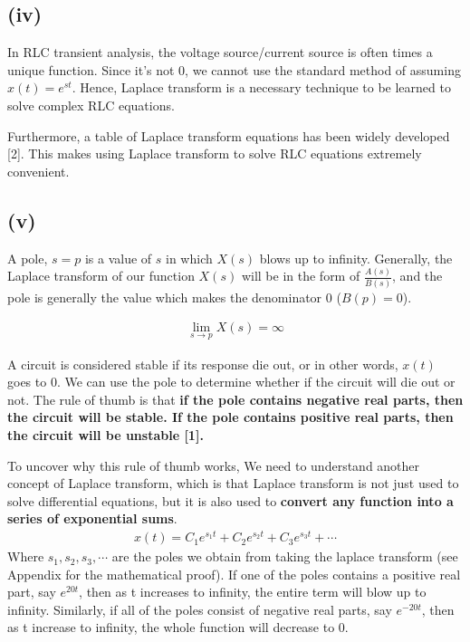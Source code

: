 \subsection{(iv)}
In RLC transient analysis, the voltage source/current source is often times a unique function. Since it's not 0, we cannot use the standard method of assuming $x(t)=e^{st}$. Hence, Laplace transform is a necessary technique to be learned to solve complex RLC equations.

Furthermore, a table of Laplace transform equations has been widely developed [2]. This makes using Laplace transform to solve RLC equations extremely convenient.

\subsection{(v)}
A pole, $s=p$ is a value of $s$ in which $X(s)$ blows up to infinity. Generally, the Laplace transform of our function $X(s)$ will be in the form of $\frac{A(s)}{B(s)}$, and the pole is generally the value which makes the denominator 0 ($B(p)=0$).

\begin{align*}
    \boxed{\lim_{s \rightarrow p}X(s) = \infty}
\end{align*}

A circuit is considered stable if its response die out, or in other words, $x(t)$ goes to 0. We can use the pole to determine whether if the circuit will die out or not. The rule of thumb is that \textbf{if the pole contains negative real parts, then the circuit will be stable. If the pole contains positive real parts, then the circuit will be unstable [1].}

To uncover why this rule of thumb works, We need to understand another concept of Laplace transform, which is that Laplace transform is not just used to solve differential equations, but it is also used to \textbf{convert any function into a series of exponential sums}.
\begin{align*}
    \boxed{x(t) = C_1e^{s_1t} + C_2e^{s_2t} + C_3e^{s_3t} + \cdots}
\end{align*}
Where $s_1, s_2, s_3, \cdots$ are the poles we obtain from taking the laplace transform (see Appendix for the mathematical proof). If one of the poles contains a positive real part, say $e^{20t}$, then as t increases to infinity, the entire term will blow up to infinity. Similarly, if all of the poles consist of negative real parts, say $e^{-20t}$, then as t increase to infinity, the whole function will decrease to 0.

